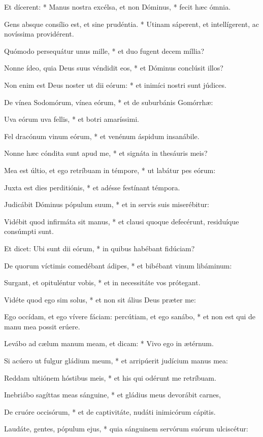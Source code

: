 Et dícerent: * Manus nostra excélsa, et non Dóminus, * fecit hæc ómnia.

Gens absque consílio est, et sine prudéntia. * Utinam sáperent, et intellígerent, ac novíssima providérent.

Quómodo persequátur unus mille, * et duo fugent decem míllia?

Nonne ídeo, quia Deus suus véndidit eos, * et Dóminus conclúsit illos?

Non enim est Deus noster ut dii eórum: * et inimíci nostri sunt júdices.

De vínea Sodomórum, vínea eórum, * et de suburbánis Gomórrhæ:

Uva eórum uva fellis, * et botri amaríssimi.

Fel dracónum vinum eórum, * et venénum áspidum insanábile.

Nonne hæc cóndita sunt apud me, * et signáta in thesáuris meis?

Mea est últio, et ego retríbuam in témpore, * ut labátur pes eórum:

Juxta est dies perditiónis, * et adésse festínant témpora.

Judicábit Dóminus pópulum suum, * et in servis suis miserébitur:

Vidébit quod infirmáta sit manus, * et clausi quoque defecérunt, residuíque consúmpti sunt.

Et dicet: Ubi sunt dii eórum, * in quibus habébant fidúciam?

De quorum víctimis comedébant ádipes, * et bibébant vinum libáminum:

Surgant, et opituléntur vobis, * et in necessitáte vos prótegant.

Vidéte quod ego sim solus, * et non sit álius Deus præter me:

Ego occídam, et ego vívere fáciam: percútiam, et ego sanábo, * et non est qui de manu mea possit erúere.

Levábo ad cælum manum meam, et dicam: * Vivo ego in ætérnum.

Si acúero ut fulgur gládium meum, * et arripúerit judícium manus mea:

Reddam ultiónem hóstibus meis, * et his qui odérunt me retríbuam.

Inebriábo sagíttas meas sánguine, * et gládius meus devorábit carnes,

De cruóre occisórum, * et de captivitáte, nudáti inimicórum cápitis.

Laudáte, gentes, pópulum ejus, * quia sánguinem servórum suórum ulciscétur:

